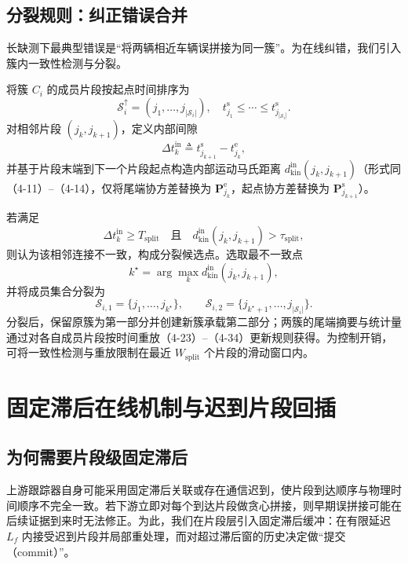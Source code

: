 \documentclass{xdupgthesis}
\begin{document}
\subsection{分裂规则：纠正错误合并}
长缺测下最典型错误是“将两辆相近车辆误拼接为同一簇”。为在线纠错，我们引入簇内一致性检测与分裂。

将簇 $C_i$ 的成员片段按起点时间排序为
\[
\mathcal{S}_i^{\uparrow}=(j_1,\ldots,j_{|\mathcal{S}_i|}),\quad
t_{j_1}^{\mathrm{s}}\le \cdots \le t_{j_{|\mathcal{S}_i|}}^{\mathrm{s}}.
\]
对相邻片段 $(j_k,j_{k+1})$，定义内部间隙
\begin{equation}
	\Delta t_k^{\mathrm{in}} \triangleq t_{j_{k+1}}^{\mathrm{s}}-t_{j_k}^{\mathrm{e}},
	\tag{4-38}
\end{equation}
并基于片段末端到下一个片段起点构造内部运动马氏距离 $d_{\mathrm{kin}}^{\mathrm{in}}(j_k,j_{k+1})$（形式同（4-11）--（4-14），仅将尾端协方差替换为 $\mathbf{P}_{j_k}^{\mathrm{e}}$，起点协方差替换为 $\mathbf{P}_{j_{k+1}}^{\mathrm{s}}$）。

若满足
\begin{equation}
	\Delta t_k^{\mathrm{in}}\ge T_{\mathrm{split}}
	\quad \text{且}\quad
	d_{\mathrm{kin}}^{\mathrm{in}}(j_k,j_{k+1})>\tau_{\mathrm{split}},
	\tag{4-39}
\end{equation}
则认为该相邻连接不一致，构成分裂候选点。选取最不一致点
\begin{equation}
	k^\star=\arg\max_k d_{\mathrm{kin}}^{\mathrm{in}}(j_k,j_{k+1}),
	\tag{4-40}
\end{equation}
并将成员集合分裂为
\[
\mathcal{S}_{i,1}=\{j_1,\ldots,j_{k^\star}\},\qquad
\mathcal{S}_{i,2}=\{j_{k^\star+1},\ldots,j_{|\mathcal{S}_i|}\}.
\]
分裂后，保留原簇为第一部分并创建新簇承载第二部分；两簇的尾端摘要与统计量通过对各自成员片段按时间重放（4-23）--（4-34）更新规则获得。为控制开销，可将一致性检测与重放限制在最近 $W_{\mathrm{split}}$ 个片段的滑动窗口内。

\section{固定滞后在线机制与迟到片段回插}
\label{sec:fixedlag_zh}
\subsection{为何需要片段级固定滞后}
上游跟踪器自身可能采用固定滞后关联或存在通信迟到，使片段到达顺序与物理时间顺序不完全一致。若下游立即对每个到达片段做贪心拼接，则早期误拼接可能在后续证据到来时无法修正。为此，我们在片段层引入固定滞后缓冲：在有限延迟 $L_f$ 内接受迟到片段并局部重处理，而对超过滞后窗的历史决定做“提交（commit）”。
\end{document}
